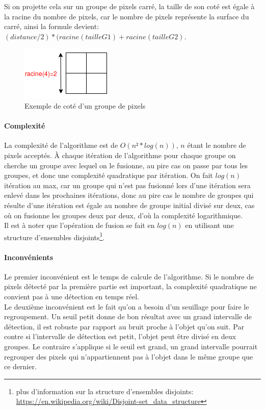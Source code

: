 \documentclass[12pt]{report}
\begin{document}
	Si on projette cela sur un groupe de pixels carré, la taille de son coté est égale à la racine du nombre de pixels, car le nombre de pixels représente la surface du carré, ainsi la formule devient: \textbf{$(distance/2)*(racine(tailleG1)+racine(tailleG2)$}.
	\begin{figure}[H]
		\centering
		\includegraphics[scale=0.75]{imgs/GroupeSide.png}
		\caption{Exemple de coté d'un groupe de pixels}
		\label{fig:GroupeSide}
	\end{figure}
	\paragraph{Complexité}La complexité de l’algorithme est de $O(n²*log(n))$, $n$ étant le nombre de pixels acceptés. À chaque itération de l’algorithme pour chaque groupe on cherche un groupe avec lequel on le fusionne, au pire cas on passe par tous les groupes, et donc une complexité quadratique par itération. On fait $log(n)$ itération au max, car un groupe qui n’est pas fusionné lors d’une itération sera enlevé dans les prochaines itérations, donc au pire cas le nombre de groupes qui résulte d’une itération est égale au nombre de groupe initial divisé sur deux, cas où on fusionne les groupes deux par deux, d’où la complexité logarithmique.\\
	Il est à noter que l'opération de fusion se fait en $log(n)$ en utilisant une structure d'ensembles disjoints\footnote{plus d'information sur la structure d'ensembles disjoints: \href{https://en.wikipedia.org/wiki/Disjoint-set_data_structure}{https://en.wikipedia.org/wiki/Disjoint-set\_data\_structure}}.
	
	\paragraph{Inconvénients}
	
	Le premier inconvénient est le temps de calcule de l’algorithme. Si le nombre de pixels détecté par la première partie est important, la complexité quadratique ne convient pas à une détection en temps réel.\\
	
	Le deuxième inconvénient est le fait qu’on a besoin d’un seuillage pour faire le regroupement. Un seuil petit donne de bon résultat avec un grand intervalle de détection, il est robuste par rapport au bruit proche à l’objet qu’on suit. Par contre si l’intervalle de détection est petit, l’objet peut être divisé en deux groupes. Le contraire s’applique si le seuil est grand, un grand intervalle pourrait regrouper des pixels qui n’appartiennent pas à l’objet dans le même groupe que ce dernier.
\end{document}
